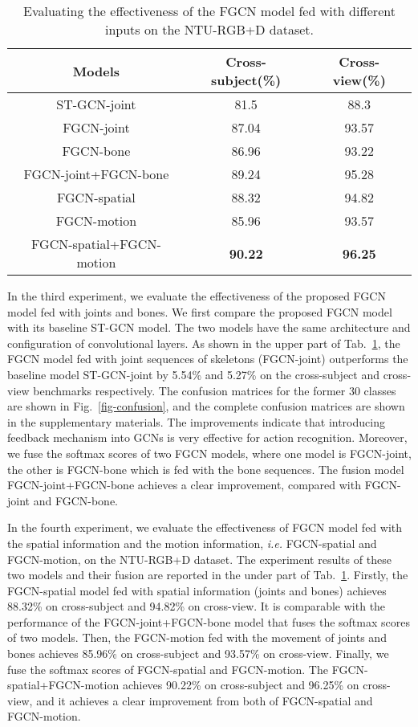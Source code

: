 \documentclass[runningheads]{llncs}
\begin{document}
\begin{table}[t]
	\caption{Evaluating the effectiveness of the FGCN model fed with different inputs on the NTU-RGB+D dataset.}
	\label{tab-joint-bone}
	\tabcolsep=6pt
	\centering
	\begin{tabular}{ccc}
		\hline
		Models & Cross-subject(\%) & Cross-view(\%) \\
		\hline
		ST-GCN-joint \cite{yan2018spatial} &81.5 &88.3\\
		FGCN-joint &87.04 &93.57	\\
		FGCN-bone	&86.96 &93.22 \\
		FGCN-joint+FGCN-bone	&89.24 &95.28 \\	
		\hline
		FGCN-spatial &88.32 &94.82	\\
		FGCN-motion	&85.96 &93.57 \\
		FGCN-spatial+FGCN-motion	&\textbf{90.22} &\textbf{96.25} \\	
		\hline
	\end{tabular}
\end{table}

In the third experiment, we evaluate the effectiveness of the proposed FGCN model fed with joints and bones. We first compare the proposed FGCN model with its baseline ST-GCN model. The two models have the same architecture and configuration of convolutional layers. As shown in the upper part of Tab.~\ref{tab-joint-bone}, the FGCN model fed with joint sequences of skeletons (FGCN-joint) outperforms the baseline model ST-GCN-joint by 5.54\% and 5.27\% on the cross-subject and cross-view benchmarks respectively. The confusion matrices for the former 30 classes are shown in Fig.~\ref{fig-confusion}, and the complete confusion matrices are shown in the supplementary materials. The improvements indicate that introducing feedback mechanism into GCNs is very effective for action recognition. Moreover, we fuse the softmax scores of two FGCN models, where one model is FGCN-joint, the other is FGCN-bone which is fed with the bone sequences. The fusion model FGCN-joint+FGCN-bone achieves a clear improvement, compared with FGCN-joint and FGCN-bone.



In the fourth experiment, we evaluate the effectiveness of FGCN model fed with the spatial information and the motion information, \textit{i.e.} FGCN-spatial and FGCN-motion, on the NTU-RGB+D dataset. The experiment results of these two models and their fusion are reported in the under part of Tab.~\ref{tab-joint-bone}. Firstly, the FGCN-spatial model fed with spatial information (joints and bones) achieves 88.32\% on cross-subject and 94.82\% on cross-view. It is comparable with the performance of the FGCN-joint+FGCN-bone model that fuses the softmax scores of two models. Then, the FGCN-motion fed with the movement of joints and bones achieves 85.96\% on cross-subject and 93.57\% on cross-view. Finally, we fuse the softmax scores of FGCN-spatial and FGCN-motion. The FGCN-spatial+FGCN-motion achieves 90.22\% on cross-subject and 96.25\% on cross-view, and it achieves a clear improvement from both of FGCN-spatial and FGCN-motion.
\end{document}
